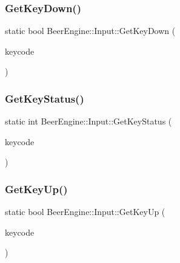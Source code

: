 \mbox{\label{class_beer_engine_1_1_input_ab3093c905099025b3dcd0c67dc31ed82}} 
\subsubsection{\texorpdfstring{Get\+Key\+Down()}{GetKeyDown()}}
{\footnotesize\ttfamily static bool Beer\+Engine\+::\+Input\+::\+Get\+Key\+Down (\begin{DoxyParamCaption}\item[{\mbox{\hyperlink{namespace_beer_engine_a94f0b552f6dc910de8cdb44207981f53}{Key\+Code}}}]{keycode }\end{DoxyParamCaption})\hspace{0.3cm}{\ttfamily [static]}}

\mbox{\label{class_beer_engine_1_1_input_a36af1091a677481607d7a197585fd379}} 
\subsubsection{\texorpdfstring{Get\+Key\+Status()}{GetKeyStatus()}}
{\footnotesize\ttfamily static int Beer\+Engine\+::\+Input\+::\+Get\+Key\+Status (\begin{DoxyParamCaption}\item[{\mbox{\hyperlink{namespace_beer_engine_a94f0b552f6dc910de8cdb44207981f53}{Key\+Code}}}]{keycode }\end{DoxyParamCaption})\hspace{0.3cm}{\ttfamily [static]}}

\mbox{\label{class_beer_engine_1_1_input_aace9501b3e8bde001dc46dea904504b0}} 
\subsubsection{\texorpdfstring{Get\+Key\+Up()}{GetKeyUp()}}
{\footnotesize\ttfamily static bool Beer\+Engine\+::\+Input\+::\+Get\+Key\+Up (\begin{DoxyParamCaption}\item[{\mbox{\hyperlink{namespace_beer_engine_a94f0b552f6dc910de8cdb44207981f53}{Key\+Code}}}]{keycode }\end{DoxyParamCaption})\hspace{0.3cm}{\ttfamily [static]}}

